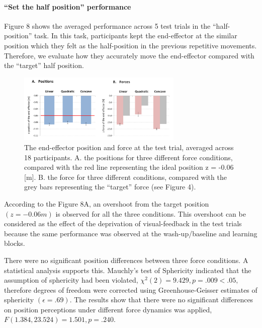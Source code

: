 \paragraph{“Set the half position” performance}
Figure 8 shows the averaged performance across 5 test trials in the “half-position” task. In this task, participants kept the end-effector at the similar position which they felt as the half-position in the previous repetitive movements. Therefore, we evaluate how they accurately move the end-effector compared with the “target” half position.
%
\begin{figure}
	\centering
	\includegraphics[width=0.7\textwidth]{Chie/figs/Figure8.png}
	\caption{The end-effector position and force at the test trial, averaged across 18 participants. 
		A. the positions for three different force conditions, compared with the red line representing the ideal position z = -0.06 [m]. B. the force for three different conditions, compared with the grey bars representing the “target” force (see Figure 4).}
	\label{testrial}
\end{figure}
According to the Figure 8A, an overshoot  from the target position $(z = -0.06 m)$ is observed for all the three conditions. This overshoot can be considered as the effect of the deprivation of visual-feedback in the test trials because the same performance was observed at the wash-up/baseline and learning blocks.

There were no significant position differences between three force conditions. A statistical analysis supports this. Mauchly’s test of Sphericity indicated that the assumption of sphericity had been violated, $\chi^2 (2) = 9.429, p = .009 < .05, $ therefore degrees of freedom were corrected using Greenhouse-Geisser estimates of sphericity $(\epsilon = .69)$. The results show that there were no significant differences on position perceptions under different force dynamics was applied, $F(1.384, 23.524) = 1.501, p = .240$.


